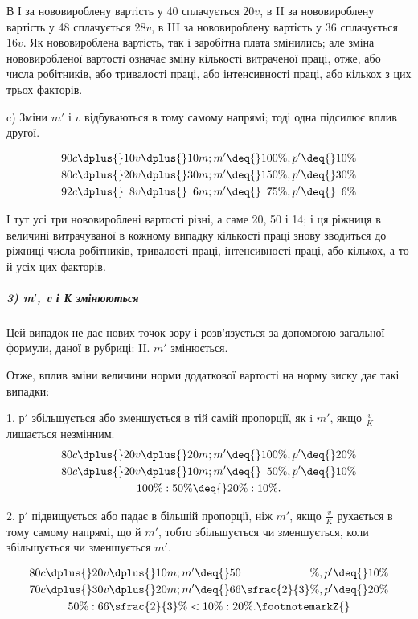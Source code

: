 \baselineskip

В І за нововироблену вартість у 40 сплачується $20 v$, в II
за нововироблену вартість у 48 сплачується $28 v$, в III за нововироблену
вартість у 36 сплачується $16 v$. Як нововироблена
вартість, так і заробітна плата змінились; але зміна нововиробленої
вартості означає зміну кількості витраченої праці, отже,
або числа робітників, або тривалості праці, або інтенсивності
праці, або кількох з цих трьох факторів.

c) Зміни $m'$ і $v$ відбуваються в тому самому напрямі; тоді
одна підсилює вплив другої.

\begin{gather*}
90 c \dplus{} 10 v \dplus{} 10 m; m' \deq{} 100\%, p' \deq{} 10\% \\
80 c \dplus{} 20 v \dplus{} 30 m; m' \deq{} 150\%, p' \deq{} 30\% \\
92 c \dplus{} \phantom{0}8 v \dplus{} \phantom{0}6 m; m' \deq{} \phantom{1}75\%, p' \deq{} \phantom{1}6\%
\end{gather*}

\noindent{}І тут усі три нововироблені вартості різні, а саме 20, 50 і 14;
і ця ріжниця в величині витрачуваної в кожному випадку кількості
праці знову зводиться до ріжниці числа робітників, тривалості
праці, інтенсивності праці, або кількох, а то й усіх цих факторів.



\subparagraph*{3) m′, v і К змінюються}
Цей випадок не дає нових точок зору і розв’язується за допомогою
загальної формули, даної в рубриці: II. $m'$ змінюється.

Отже, вплив зміни величини норми додаткової вартості на
норму зиску дає такі випадки:

1. $р'$ збільшується або зменшується в тій самій пропорції, як
i $m'$, якщо $\frac{v}{K}$  лишається незмінним.
\begin{gather*}
80 c \dplus{} 20 v \dplus{} 20 m; m' \deq{} 100\%, p' \deq{} 20\% \\
80 c \dplus{} 20 v \dplus{} 10 m; m' \deq{} \phantom{1}50\%, p' \deq{} 10\% \\
100\% : 50\% \deq{} 20\% : 10\%.
\end{gather*}

2. $р'$ підвищується або падає в більшій пропорції, ніж $m'$,
якщо $\frac{v}{K}$ рухається в тому самому напрямі, що й $m'$, тобто
збільшується чи зменшується, коли збільшується чи зменшується
$m'$.

\begin{gather*}
80 c \dplus{} 20 v \dplus{} 10 m; m' \deq{} 50\phantom{\sfrac{2}{3}}\%, p' \deq{} 10\% \\
70 c \dplus{} 30 v \dplus{} 20 m; m' \deq{} 66\sfrac{2}{3}\%, p' \deq{} 20\% \\
50\% : 66\sfrac{2}{3}\% < 10\% : 20\%.\text{\footnotemarkZ{}}
\end{gather*}

\disablefootnotebreak{}
\enablefootnotebreak{}

